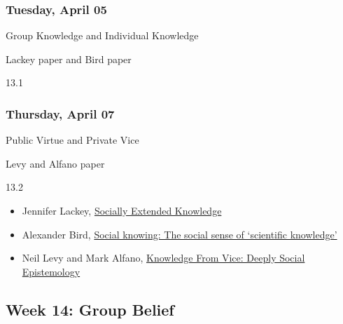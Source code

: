 \documentclass[
]{article}
\providecommand{\tightlist}{%
  \setlength{\itemsep}{0pt}\setlength{\parskip}{0pt}}
\begin{document}
\begin{multicols}{2}

\hypertarget{tuesday-april-05}{%
\subsubsection{Tuesday, April 05}\label{tuesday-april-05}}

\begin{description}
\tightlist
\item[Topic]
Group Knowledge and Individual Knowledge
\item[Reading]
Lackey paper and Bird paper
\item[Video lectures]
13.1
\end{description}

\hypertarget{thursday-april-07}{%
\subsubsection{Thursday, April 07}\label{thursday-april-07}}

\begin{description}
\tightlist
\item[Topic]
Public Virtue and Private Vice
\item[Reading]
Levy and Alfano paper
\item[Video lectures]
13.2
\end{description}

\end{multicols}

\begin{itemize}
\tightlist
\item
  Jennifer Lackey, \href{https://philpapers.org/rec/LACSEK}{Socially
  Extended Knowledge}
\item
  Alexander Bird, \href{https://philpapers.org/rec/BIRSKT}{Social
  knowing: The social sense of `scientific knowledge'}
\item
  Neil Levy and Mark Alfano,
  \href{https://philpapers.org/rec/LEVKFV}{Knowledge From Vice: Deeply
  Social Epistemology}
\end{itemize}

\hypertarget{week-14-group-belief}{%
\subsection{Week 14: Group Belief}\label{week-14-group-belief}}
\end{document}
